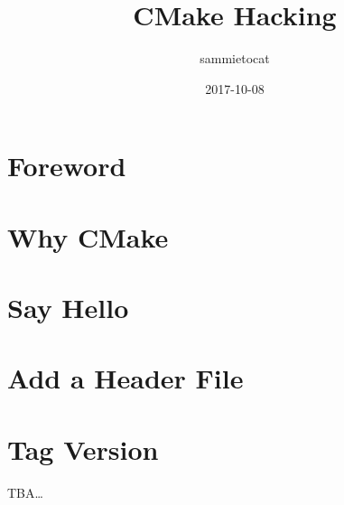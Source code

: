 \documentclass[a4paper,10pt]{book}
\title{CMake Hacking}
\author{sammietocat}
\date{2017-10-08}
\begin{document}
\maketitle
\tableofcontents

\iffalse
\begin{mquote}
  Hello Box
\end{mquote}
\fi

\chapter*{Foreword}

\chapter{Why CMake}
  

\chapter{Say Hello}
  

\chapter{Add a Header File}
  

\chapter{Tag Version}
TBA\dots

\printindex
\end{document}
